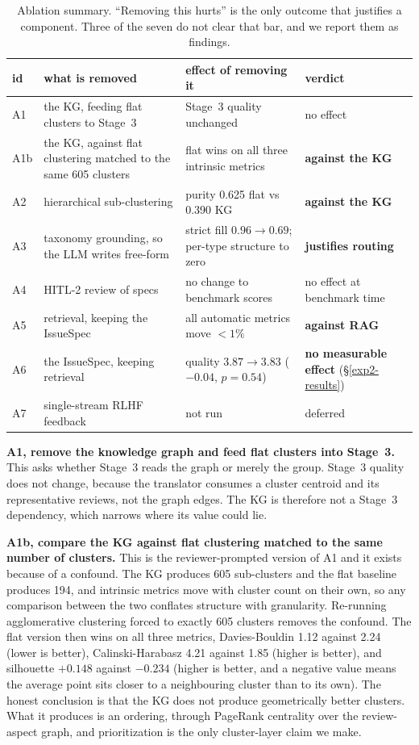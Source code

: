 \documentclass[preprint,12pt]{elsarticle}
\begin{document}
\begin{table}[!htbp]\centering\footnotesize
\caption{Ablation summary. ``Removing this hurts'' is the only outcome that justifies a
component. Three of the seven do not clear that bar, and we report them as findings.}\label{tab:ablation-summary}
\begin{tabular}{@{}p{0.9cm}p{3.6cm}p{3.6cm}p{2.3cm}@{}}\toprule
id & what is removed & effect of removing it & verdict \\\midrule
A1 & the KG, feeding flat clusters to Stage~3 & Stage~3 quality unchanged & no effect \\
A1b & the KG, against flat clustering matched to the same 605 clusters & flat wins on all three intrinsic metrics & \textbf{against the KG} \\
A2 & hierarchical sub-clustering & purity 0.625 flat vs 0.390 KG & \textbf{against the KG} \\
A3 & taxonomy grounding, so the LLM writes free-form & strict fill $0.96 \to 0.69$; per-type structure to zero & \textbf{justifies routing} \\
A4 & HITL-2 review of specs & no change to benchmark scores & no effect at benchmark time \\
A5 & retrieval, keeping the IssueSpec & all automatic metrics move $<1\%$ & \textbf{against RAG} \\
A6 & the IssueSpec, keeping retrieval & quality $3.87 \to 3.83$ ($-0.04$, $p=0.54$) & \textbf{no measurable effect} (\S\ref{exp2-results}) \\
A7 & single-stream RLHF feedback & not run & deferred \\
\bottomrule\end{tabular}\end{table}

  \textbf{A1, remove the knowledge graph and feed flat clusters into Stage~3.} This asks whether
  Stage~3 reads the graph or merely the group. Stage~3 quality does not change, because the
  translator consumes a cluster centroid and its representative reviews, not the graph edges. The
  KG is therefore not a Stage~3 dependency, which narrows where its value could lie.

  \textbf{A1b, compare the KG against flat clustering matched to the same number of clusters.}
  This is the reviewer-prompted version of A1 and it exists because of a confound. The KG
  produces 605 sub-clusters and the flat baseline produces 194, and intrinsic metrics move with
  cluster count on their own, so any comparison between the two conflates structure with
  granularity. Re-running agglomerative clustering forced to exactly 605 clusters removes the
  confound. The flat version then wins on all three metrics, Davies-Bouldin 1.12 against 2.24
  (lower is better), Calinski-Harabasz 4.21 against 1.85 (higher is better), and silhouette
  $+0.148$ against $-0.234$ (higher is better, and a negative value means the average point sits
  closer to a neighbouring cluster than to its own). The honest conclusion is that the KG does
  not produce geometrically better clusters. What it produces is an ordering, through PageRank
  centrality over the review-aspect graph, and prioritization is the only cluster-layer claim we
  make.
\end{document}
